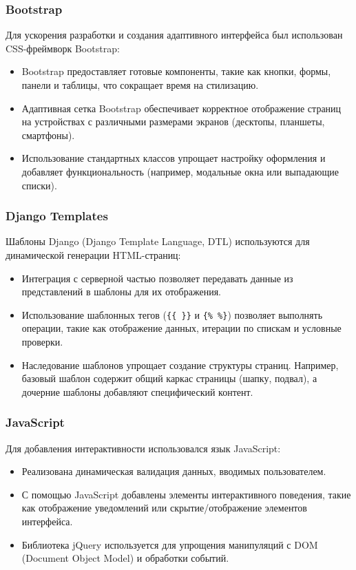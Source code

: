 {\subsubsection*{Bootstrap}
Для ускорения разработки и создания адаптивного интерфейса был использован CSS-фреймворк Bootstrap:
\begin{itemize}
    \item Bootstrap предоставляет готовые компоненты, такие как кнопки, формы, панели и таблицы, что сокращает время на стилизацию.
    \item Адаптивная сетка Bootstrap обеспечивает корректное отображение страниц на устройствах с различными размерами экранов (десктопы, планшеты, смартфоны).
    \item Использование стандартных классов упрощает настройку оформления и добавляет функциональность (например, модальные окна или выпадающие списки).
\end{itemize}

\subsubsection*{Django Templates}
Шаблоны Django (Django Template Language, DTL) используются для динамической генерации HTML-страниц:
\begin{itemize}
    \item Интеграция с серверной частью позволяет передавать данные из представлений в шаблоны для их отображения.
    \item Использование шаблонных тегов (\texttt{\{\{\ \}\}} и \texttt{\{\%\ \%\}}) позволяет выполнять операции, такие как отображение данных, итерации по спискам и условные проверки.
    \item Наследование шаблонов упрощает создание структуры страниц. Например, базовый шаблон содержит общий каркас страницы (шапку, подвал), а дочерние шаблоны добавляют специфический контент.
\end{itemize}

\subsubsection*{JavaScript}
Для добавления интерактивности использовался язык JavaScript:
\begin{itemize}
    \item Реализована динамическая валидация данных, вводимых пользователем.
    \item С помощью JavaScript добавлены элементы интерактивного поведения, такие как отображение уведомлений или скрытие/отображение элементов интерфейса.
    \item Библиотека jQuery используется для упрощения манипуляций с DOM (Document Object Model) и обработки событий.
\end{itemize}

}
